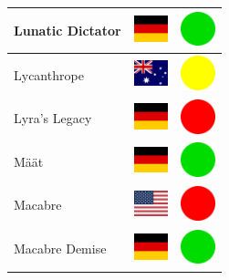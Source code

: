 \documentclass[12pt, a4paper, twoside]{report}
\begin{document}
\begin{center}
\begin{longtable}{|p{5cm}|p{2cm}|p{2cm}|}
 Lunatic Dictator                                           & \includegraphics[width=1cm]{../img/flags/de} &   \includegraphics[width=1cm]{../likes/y} \\ \hline
 Lycanthrope                                                & \includegraphics[width=1cm]{../img/flags/au} &   \includegraphics[width=1cm]{../likes/m} \\ \hline
 Lyra's Legacy                                              & \includegraphics[width=1cm]{../img/flags/de} &   \includegraphics[width=1cm]{../likes/n} \\ \hline
 Määt                                                       & \includegraphics[width=1cm]{../img/flags/de} &   \includegraphics[width=1cm]{../likes/y} \\ \hline
 Macabre                                                    & \includegraphics[width=1cm]{../img/flags/us} &   \includegraphics[width=1cm]{../likes/n} \\ \hline
 Macabre Demise                                             & \includegraphics[width=1cm]{../img/flags/de} &   \includegraphics[width=1cm]{../likes/y} \\ \hline

\end{longtable}
\end{center}
\end{document}

